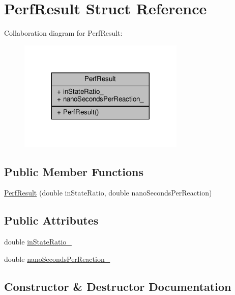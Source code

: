 \hypertarget{struct_perf_result}{}\section{Perf\+Result Struct Reference}
\label{struct_perf_result}


Collaboration diagram for Perf\+Result\+:
\nopagebreak
\begin{figure}[H]
\begin{center}
\leavevmode
\includegraphics[width=224pt]{struct_perf_result__coll__graph}
\end{center}
\end{figure}
\subsection*{Public Member Functions}
\begin{DoxyCompactItemize}
\item 
\mbox{\hyperlink{struct_perf_result_a2d3c7c80d2f39908584d816f6604a864}{Perf\+Result}} (double in\+State\+Ratio, double nano\+Seconds\+Per\+Reaction)
\end{DoxyCompactItemize}
\subsection*{Public Attributes}
\begin{DoxyCompactItemize}
\item 
double \mbox{\hyperlink{struct_perf_result_a8bbf355b71bf62a72a230a1d3ae14b60}{in\+State\+Ratio\+\_\+}}
\item 
double \mbox{\hyperlink{struct_perf_result_adec7c1ad5a7ae4c886daaff1bb953426}{nano\+Seconds\+Per\+Reaction\+\_\+}}
\end{DoxyCompactItemize}


\subsection{Constructor \& Destructor Documentation}
\mbox{\label{struct_perf_result_a2d3c7c80d2f39908584d816f6604a864}} 
